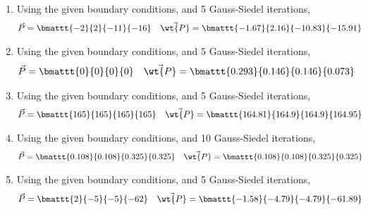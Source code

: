 \begin{enumerate}
    \item Using the given boundary conditions, and 5 Gauss-Siedel iterations,
          \begin{align}
              \vec{P}      & = \bmattt{-2}{2}{-11}{-16}             &
              \vec{\wt{P}} & = \bmattt{-1.67}{2.16}{-10.83}{-15.91}
          \end{align}

    \item Using the given boundary conditions, and 5 Gauss-Siedel iterations,
          \begin{align}
              \vec{P}      & = \bmattt{0}{0}{0}{0}                 &
              \vec{\wt{P}} & = \bmattt{0.293}{0.146}{0.146}{0.073}
          \end{align}

    \item Using the given boundary conditions, and 5 Gauss-Siedel iterations,
          \begin{align}
              \vec{P}      & = \bmattt{165}{165}{165}{165}           &
              \vec{\wt{P}} & = \bmattt{164.81}{164.9}{164.9}{164.95}
          \end{align}

    \item Using the given boundary conditions, and 10 Gauss-Siedel iterations,
          \begin{align}
              \vec{P}      & = \bmattt{0.108}{0.108}{0.325}{0.325} &
              \vec{\wt{P}} & = \bmattt{0.108}{0.108}{0.325}{0.325}
          \end{align}

    \item Using the given boundary conditions, and 5 Gauss-Siedel iterations,
          \begin{align}
              \vec{P}      & = \bmattt{2}{-5}{-5}{-62}              &
              \vec{\wt{P}} & = \bmattt{-1.58}{-4.79}{-4.79}{-61.89}
          \end{align}


\end{enumerate}
